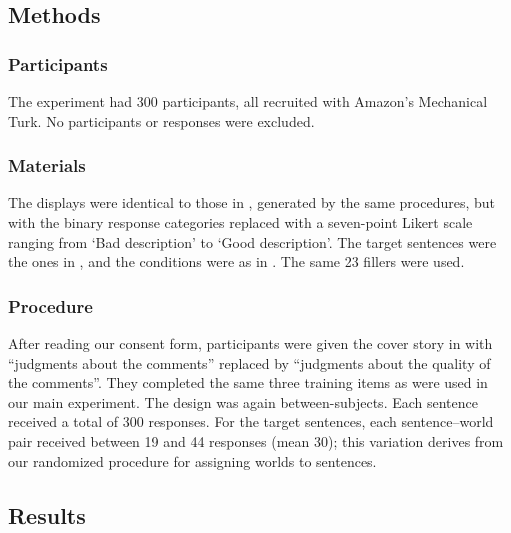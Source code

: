 \documentclass[leqno,12pt]{article}
\begin{document}
\begin{appendix}
\subsection{Methods}

\subsubsection{Participants}

The experiment had 300 participants, all recruited with Amazon's
Mechanical Turk. No participants or responses were excluded.

\subsubsection{Materials}

The displays were identical to those in ,
generated by the same procedures, but with the binary response
categories replaced with a seven-point Likert scale ranging from `Bad
description' to `Good description'. The target sentences were the ones
in , and the conditions were as in . The same 23
fillers were used.

\subsubsection{Procedure} 

After reading our consent form, participants were given the cover
story in  with ``judgments about the comments''
replaced by ``judgments about the quality of the comments''.  %
They completed the same three training items as were used in our main
experiment. The design was again between-subjects.  Each sentence
received a total of 300 responses. For the target sentences, each
sentence--world pair received between 19 and 44 responses (mean 30);
this variation derives from our randomized procedure for assigning
worlds to sentences.


\subsection{Results}


\end{appendix}
\end{document}
